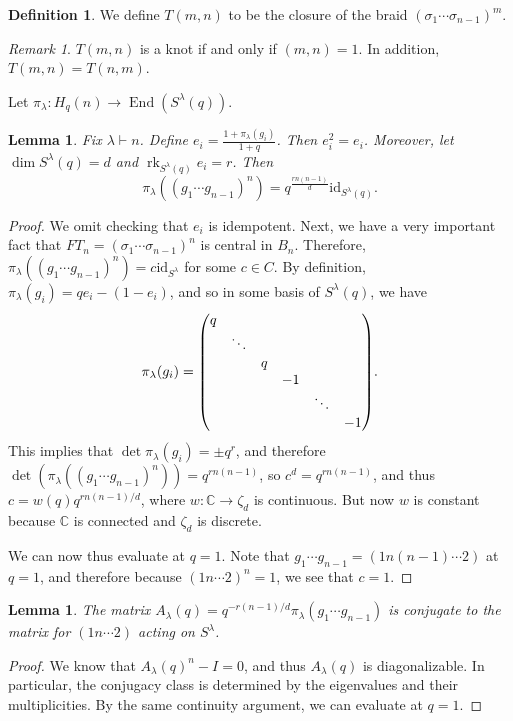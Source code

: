 \documentclass[leqno, openany]{memoir}
\newtheorem{lem}[thm]{Lemma}
\theoremstyle{definition}
\newtheorem{defn}[thm]{Definition}
\theoremstyle{remark}
\newtheorem{rmk}[thm]{Remark}
\theoremstyle{plain}
\theoremstyle{definition}
\theoremstyle{remark}
\newcommand{\C}{\mathbb{C}}
\newcommand{\mr}[1]{\mathrm{#1}}
\newcommand{\on}[1]{\operatorname{#1}}
\newcommand{\1}{\mathbf{1}}
\newcommand{\2}{\mathbf{2}}
\newcommand{\3}{\mathbf{3}}
\DeclareMathOperator{\End}{End}
\begin{document}
\begin{defn}
    We define $T(m, n)$ to be the closure of the braid $(\sigma_1 \cdots \sigma_{n-1})^m$. 
\end{defn}

\begin{rmk}
    $T(m,n)$ is a knot if and only if $(m,n) = 1$. In addition, $T(m,n) = T(n,m)$.
\end{rmk}

Let $\pi_{\lambda} \colon H_q(n) \to \End(S^{\lambda}(q))$.
\begin{lem}
    Fix $\lambda \vdash n$. Define $e_i = \frac{1 + \pi_{\lambda}(g_i)}{1+q}$. Then $e_i^2 = e_i$. Moreover, let $\dim S^{\lambda}(q) = d$ and $\on{rk}_{S^{\lambda}(q)} e_i = r$. Then
    \[ \pi_{\lambda}((g_1 \cdots g_{n-1})^n) = q^{\frac{rn(n-1)}{d}} \mr{id}_{S^{\lambda}(q)}. \]
\end{lem}

\begin{proof}
    We omit checking that $e_i$ is idempotent. Next, we have a very important fact that $FT_n = (\sigma_1 \cdots \sigma_{n-1})^n$ is central in $B_n$. Therefore, $\pi_{\lambda}((g_1 \cdots g_{n-1})^n) = c \mr{id}_{S^{\lambda}}$ for some $c \in C$. By definition, $\pi_{\lambda}(g_i) = q e_i - (1-e_i)$, and so in some basis of $S^{\lambda}(q)$, we have
    \[ \pi_{\lambda}(g_i) = \mqty(\dmat{q,\ddots,q,-1,\ddots,-1}). \]
    This implies that $\det \pi_{\lambda}(g_i) = \pm q^r$, and therefore $\det(\pi_{\lambda}((g_1 \cdots g_{n-1})^n)) = q^{rn(n-1)}$, so $c^d = q^{rn(n-1)}$, and thus $c = w(q) q^{rn(n-1)/d}$, where $w \colon \C \to \zeta_d$ is continuous. But now $w$ is constant because $\C$ is connected and $\zeta_d$ is discrete.

    We can now thus evaluate at $q = 1$. Note that $g_1 \cdots g_{n-1} = (1 n (n-1) \cdots 2)$ at $q = 1$, and therefore because $(1 n \cdots 2)^n = 1$, we see that $c = 1$.
\end{proof}

\begin{lem}
    The matrix $A_{\lambda}(q) = q^{-r(n-1)/d} \pi_{\lambda}(g_1 \cdots g_{n-1})$ is conjugate to the matrix for $(1 n \cdots 2)$ acting on $S^{\lambda}$.
\end{lem}

\begin{proof}
    We know that $A_{\lambda}(q)^n - I = 0$, and thus $A_{\lambda}(q)$ is diagonalizable. In particular, the conjugacy class is determined by the eigenvalues and their multiplicities. By the same continuity argument, we can evaluate at $q = 1$.
\end{proof}
\end{document}
